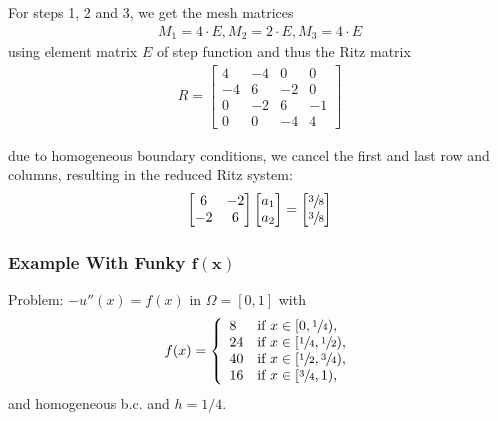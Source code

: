For steps 1, 2 and 3, we get the mesh matrices
\begin{align*}
    M_1 = 4\cdot E, M_2=2\cdot E, M_3 = 4\cdot E
\end{align*}
using element matrix $E$ of step function and thus the Ritz matrix
\begin{align*}
    R=\begin{bmatrix}
        4 & -4 & 0 & 0 \\
        -4 & 6 & -2 & 0 \\
        0 & -2 & 6 & -1 \\
        0 & 0 & -4 & 4
    \end{bmatrix}
\end{align*}

due to homogeneous boundary conditions, we cancel the first and last row and columns, resulting in the reduced Ritz system:
\begin{align*}
    \begin{bmatrix}
        6 & -2 \\
        -2 & 6
    \end{bmatrix}
    \begin{bmatrix}
        a_1 \\ a_2
    \end{bmatrix}
    =
    \begin{bmatrix}
        \sfrac{3}{8} \\ \sfrac{3}{8}
    \end{bmatrix}
\end{align*}

\subsubsection{Example With Funky $\mathbf{f(x)}$}

Problem: $-u''(x) = f(x)$ in $\Omega = [0,1]$ with
\begin{align*}
    f(x) = \left\{
    \begin{array}{ll}
        8 & \text{if } x\in [0,\sfrac{1}{4}), \\
        24 & \text{if } x\in [\sfrac{1}{4},\sfrac{1}{2}), \\
        40 & \text{if } x\in [\sfrac{1}{2},\sfrac{3}{4}), \\
        16 & \text{if } x\in [\sfrac{3}{4},1),
    \end{array}
    \right.
\end{align*}
and homogeneous b.c. and $h = 1/4$.


